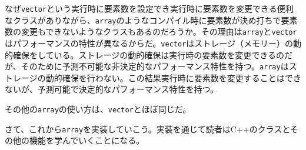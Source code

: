 なぜ\texttt{vector}という実行時に要素数を設定でき実行時に要素数を変更できる便利なクラスがありながら、\texttt{array}のようなコンパイル時に要素数が決め打ちで要素数の変更もできないようなクラスもあるのだろうか。その理由は\texttt{array}と\texttt{vector}はパフォーマンスの特性が異なるからだ。\texttt{vector}はストレージ（メモリー）の動的確保をしている。ストレージの動的確保は実行時の要素数を変更できるのだが、そのために予測不可能な非決定的なパフォーマンス特性を持つ。\texttt{array}はストレージの動的確保を行わない。この結果実行時に要素数を変更することはできないが、予測可能で決定的なパフォーマンス特性を持つ。

その他の\texttt{array}の使い方は、\texttt{vector}とほぼ同じだ。

さて、これから\texttt{array}を実装していこう。実装を通じて読者はC++のクラスとその他の機能を学んでいくことになる。

